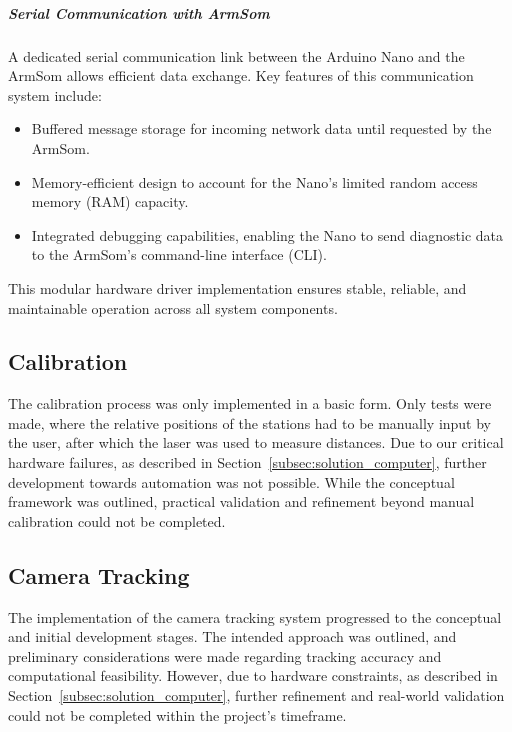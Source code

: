 \subparagraph{Serial Communication with ArmSom}
A dedicated serial communication link between the Arduino Nano \cite{arduino_nano_dfrobot} and the ArmSom \cite{armsom_sige7} allows efficient data exchange. Key features of this communication system include:
\begin{itemize}
	\item Buffered message storage for incoming network data until requested by the ArmSom.
	\item Memory-efficient design to account for the Nano’s limited random access memory (RAM) capacity.
	\item Integrated debugging capabilities, enabling the Nano to send diagnostic data to the ArmSom’s command-line interface (CLI).
\end{itemize}

This modular hardware driver implementation ensures stable, reliable, and maintainable operation across all system components.


\subsection{Calibration}

The calibration process was only implemented in a basic form. Only tests were made, where the relative positions of the stations had to be manually input by the user, after which the laser \cite{dfrobot_ir_sensor} was used to measure distances. Due to our critical hardware failures, as described in Section~\ref{subsec:solution_computer}, further development towards automation was not possible. While the conceptual framework was outlined, practical validation and refinement beyond manual calibration could not be completed.

\subsection{Camera Tracking}

The implementation of the camera tracking system progressed to the conceptual and initial development stages. The intended approach was outlined, and preliminary considerations were made regarding tracking accuracy and computational feasibility. However, due to hardware constraints, as described in Section~\ref{subsec:solution_computer}, further refinement and real-world validation could not be completed within the project's timeframe.

